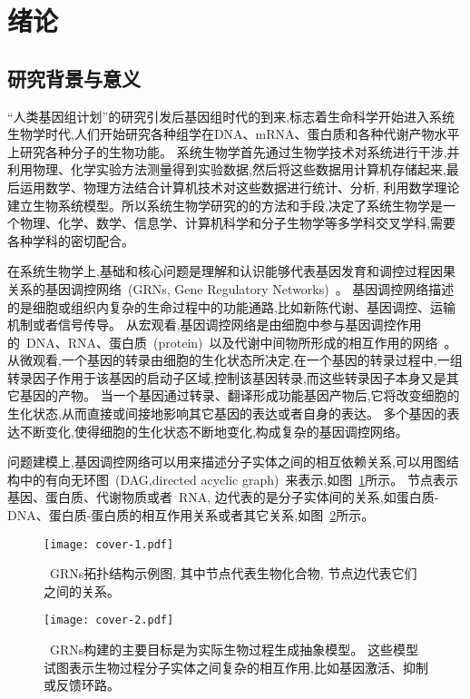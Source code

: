 \section{绪论}
\subsection{研究背景与意义}

``人类基因组计划”的研究引发后基因组时代的到来,标志着生命科学开始进入系统生物学时代,人们开始研究各种组学在DNA、mRNA、蛋白质和各种代谢产物水平上研究各种分子的生物功能。
系统生物学首先通过生物学技术对系统进行干涉,并利用物理、化学实验方法测量得到实验数据,然后将这些数据用计算机存储起来,最后运用数学、物理方法结合计算机技术对这些数据进行统计、分析,
利用数学理论建立生物系统模型。所以系统生物学研究的的方法和手段,决定了系统生物学是一个物理、化学、数学、信息学、计算机科学和分子生物学等多学科交叉学科,需要各种学科的密切配合\cite{ideker2001new}。


在系统生物学上,基础和核心问题是理解和认识能够代表基因发育和调控过程因果关系的基因调控网络~(GRNs, Gene Regulatory Networks)~。
基因调控网络描述的是细胞或组织内复杂的生命过程中的功能通路,比如新陈代谢、基因调控、运输机制或者信号传导。
从宏观看,基因调控网络是由细胞中参与基因调控作用的~DNA、RNA、蛋白质~(protein)~以及代谢中间物所形成的相互作用的网络~\cite{de2002modeling}。
从微观看,一个基因的转录由细胞的生化状态所决定,在一个基因的转录过程中,一组转录因子作用于该基因的启动子区域,控制该基因转录,而这些转录因子本身又是其它基因的产物。
当一个基因通过转录、翻译形成功能基因产物后,它将改变细胞的生化状态,从而直接或间接地影响其它基因的表达或者自身的表达。
多个基因的表达不断变化,使得细胞的生化状态不断地变化,构成复杂的基因调控网络。

问题建模上,基因调控网络可以用来描述分子实体之间的相互依赖关系,可以用图结构中的有向无环图~(DAG,directed acyclic graph)~来表示,如图~\ref{cover-1}所示。
节点表示基因、蛋白质、代谢物质或者~RNA, 边代表的是分子实体间的关系,如蛋白质-DNA、蛋白质-蛋白质的相互作用关系或者其它关系,如图~\ref{cover-2}所示。
\begin{figure}[!htbp]
    \centering
    \texttt{[image: cover-1.pdf]}
    \caption{~GRNs拓扑结构示例图, 其中节点代表生物化合物, 节点边代表它们之间的关系。
    }
    \label{cover-1}
\end{figure}
\begin{figure}[!htbp]
    \centering
    \texttt{[image: cover-2.pdf]}
    \caption{~GRNs构建的主要目标是为实际生物过程生成抽象模型。
    这些模型试图表示生物过程分子实体之间复杂的相互作用,比如基因激活、抑制或反馈环路。
    }
    \label{cover-2}
\end{figure}

